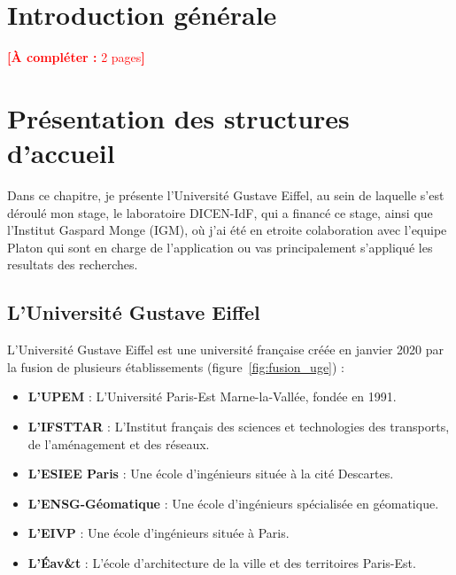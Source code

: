 \documentclass[12pt,a4paper,oneside]{report}
\newcommand{\acompleter}[1]{\textcolor{red}{\textbf{[À compléter :} #1\textbf{]}}}
\begin{document}
\cleardoublepage
{}

\chapter*{Introduction générale}
\acompleter{2 pages}

\chapter{Présentation des structures d'accueil}

Dans ce chapitre, je présente l'Université Gustave Eiffel, au sein de
laquelle s'est déroulé mon stage, le laboratoire DICEN-IdF, qui a financé
ce stage, ainsi que l'Institut Gaspard Monge (IGM), où j'ai été en etroite
 colaboration avec l'equipe Platon qui sont en charge de l'application ou vas
principalement s'appliqué les resultats des recherches.



\section{L'Université Gustave Eiffel}

L'Université Gustave Eiffel est une université française créée en janvier 2020
 par la fusion de plusieurs établissements (figure~\ref{fig:fusion_uge}) :

\begin{itemize}
    \item \textbf{L'UPEM} : L'Université Paris-Est Marne-la-Vallée, fondée en 1991.
    \item \textbf{L'IFSTTAR} : L'Institut français des sciences et technologies des transports, de l'aménagement et des réseaux.
    \item \textbf{L'ESIEE Paris} : Une école d'ingénieurs située à la cité Descartes.
    \item \textbf{L'ENSG-Géomatique} : Une école d'ingénieurs spécialisée en géomatique.
    \item \textbf{L'EIVP} : Une école d'ingénieurs située à Paris.
    \item \textbf{L'Éav\&t} : L'école d'architecture de la ville et des territoires Paris-Est.
\end{itemize}
\end{document}
